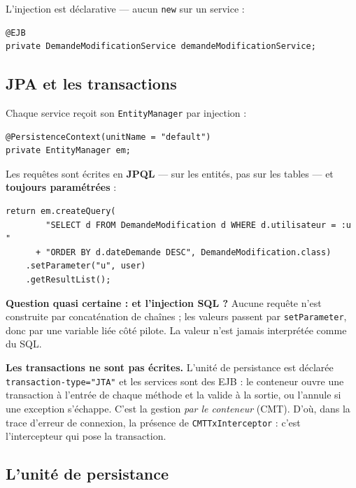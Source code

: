 \vspace{0.5em}
L'injection est déclarative --- aucun \texttt{new} sur un service :

\begin{lstlisting}[style=java]
@EJB
private DemandeModificationService demandeModificationService;
\end{lstlisting}

\subsection{JPA et les transactions}

Chaque service reçoit son \texttt{EntityManager} par injection :

\begin{lstlisting}[style=java]
@PersistenceContext(unitName = "default")
private EntityManager em;
\end{lstlisting}

Les requêtes sont écrites en \textbf{JPQL} --- sur les entités, pas sur les
tables --- et \textbf{toujours paramétrées} :

\begin{lstlisting}[style=java]
return em.createQuery(
        "SELECT d FROM DemandeModification d WHERE d.utilisateur = :u "
      + "ORDER BY d.dateDemande DESC", DemandeModification.class)
    .setParameter("u", user)
    .getResultList();
\end{lstlisting}

\begin{retenir}
\textbf{Question quasi certaine : et l'injection SQL ?} Aucune requête n'est
construite par concaténation de chaînes ; les valeurs passent par
\texttt{setParameter}, donc par une variable liée côté pilote. La valeur n'est
jamais interprétée comme du SQL.
\end{retenir}

\textbf{Les transactions ne sont pas écrites.} L'unité de persistance est
déclarée \texttt{transaction-type="JTA"} et les services sont des EJB : le
conteneur ouvre une transaction à l'entrée de chaque méthode et la valide à la
sortie, ou l'annule si une exception s'échappe. C'est la gestion \emph{par le
conteneur} (CMT). D'où, dans la trace d'erreur de connexion, la présence de
\texttt{CMTTxInterceptor} : c'est l'intercepteur qui pose la transaction.

\subsection{L'unité de persistance}

